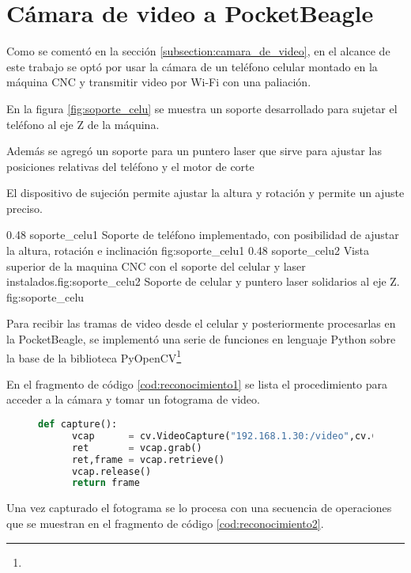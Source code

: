 \section{Cámara de video a PocketBeagle}
Como se comentó en la sección \ref{subsection:camara_de_video}, en el alcance de este trabajo se optó por usar la cámara de un teléfono celular montado en la máquina CNC y transmitir video por Wi-Fi con una paliación.\par
   En la figura \ref{fig:soporte_celu} se muestra un soporte desarrollado para sujetar el teléfono al eje Z de la máquina. \par
   Además se agregó un soporte para un puntero laser que sirve para ajustar las posiciones relativas del teléfono y el motor de corte\par
   El dispositivo de sujeción permite ajustar la altura y rotación y permite un ajuste preciso.\par

\subfigab 
{0.48} {soporte_celu1} {Soporte de teléfono implementado, con posibilidad de ajustar la altura, rotación e inclinación} {fig:soporte_celu1}
      {0.48} {soporte_celu2} {Vista superior de la maquina CNC con el soporte del celular y laser instalados.}{fig:soporte_celu2}
      {Soporte de celular y puntero laser solidarios al eje Z.}
      {fig:soporte_celu}

      Para recibir las tramas de video desde el celular y posteriormente procesarlas en la PocketBeagle, se implementó una serie de funciones en lenguaje Python sobre la base de la biblioteca PyOpenCV\footnote{\pyopencvlink}\par
   En el fragmento de código \ref{cod:reconocimiento1} se lista el procedimiento para acceder a la cámara y tomar un fotograma de video.\par

\begin{figure}[h]
   \begin{lstlisting}[language=python,caption={Conexión a la cámara del teléfono por Wi-Fi y captura de un fotograma para su posterior procesamiento.},label={cod:reconocimiento1}]
   def capture():
      vcap      = cv.VideoCapture("192.168.1.30:/video",cv.CAP_FFMPEG);
      ret       = vcap.grab()
      ret,frame = vcap.retrieve()
      vcap.release()
      return frame
   \end{lstlisting}
\end{figure}

Una vez capturado el fotograma se lo procesa con una secuencia de operaciones que se muestran en el fragmento de código \ref{cod:reconocimiento2}.

